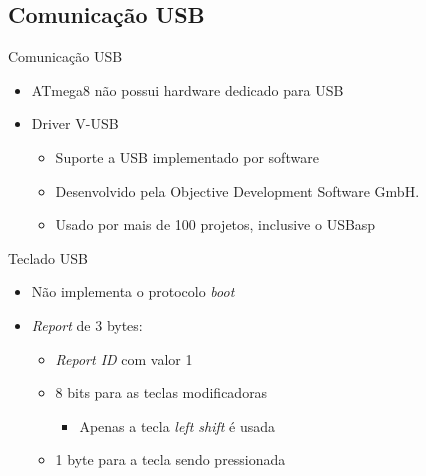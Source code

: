 \documentclass{beamer}
\begin{document}


\subsection{Comunicação USB}

\begin{frame}{Comunicação USB}
	\begin{itemize}
		\pause
		\item ATmega8 não possui hardware dedicado para USB
		\pause
		\item Driver V-USB
		\begin{itemize}
			\item Suporte a USB implementado por software
			\pause
			\item Desenvolvido pela Objective Development Software GmbH.
			\pause
			\item Usado por mais de 100 projetos\pause, inclusive o USBasp
		\end{itemize}
	\end{itemize}
\end{frame}


\begin{frame}{Teclado USB}
	\begin{itemize}
		\pause
		\item Não implementa o protocolo \emph{boot}
		\pause
		\item \emph{Report} de 3 bytes:
		\begin{itemize}
			\pause
			\item \emph{Report ID} com valor 1
			\pause
			\item 8 bits para as teclas modificadoras
			\begin{itemize}
				\pause
				\item Apenas a tecla \emph{left shift} é usada
			\end{itemize}
			\pause
			\item 1 byte para a tecla sendo pressionada
		\end{itemize}
	\end{itemize}
\end{frame}
\end{document}
